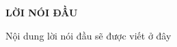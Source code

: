 \documentclass[../main.tex]{subfiles}
\begin{document}
\begin{center}
    \Large{\textbf{LỜI NÓI ĐẦU}}\\
\end{center}
\vspace{1cm}

Nội dung lời nói đầu sẽ được viết ở đây
\end{document}

